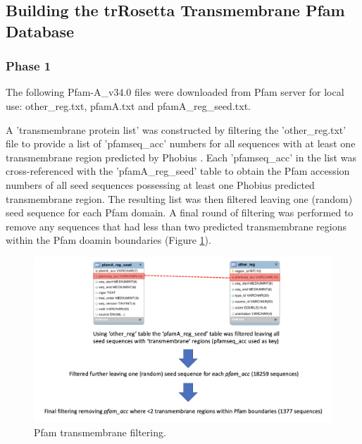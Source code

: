 \subsection{Building the trRosetta Transmembrane Pfam Database}

\subsubsection{Phase 1}

The following  Pfam-A\_v34.0 files were downloaded from Pfam server for local use: other\_reg.txt,  pfamA.txt and pfamA\_reg\_seed.txt. 

A 'transmembrane protein list' was constructed by filtering the 'other\_reg.txt' file to provide a list of 'pfamseq\_acc' numbers for all sequences with at least one transmembrane region predicted by Phobius \cite{kall2007advantages}. Each 'pfamseq\_acc' in the list was cross-referenced with the  'pfamA\_reg\_seed' table to obtain the Pfam accession numbers of all seed sequences possessing at least one Phobius predicted transmembrane region.  The resulting list was then filtered leaving one (random) seed sequence for each Pfam domain. A final round of filtering was performed to remove any sequences that had less than two predicted transmembrane regions within the Pfam doamin boundaries (Figure \ref{fig:flow_1}).

\begin{figure}[th!]
    \centering
\includegraphics[width=\linewidth]{Pfam/flow_1.png}
    \caption{Pfam transmembrane filtering.}
    \label{fig:flow_1}
    \small
\end{figure}



